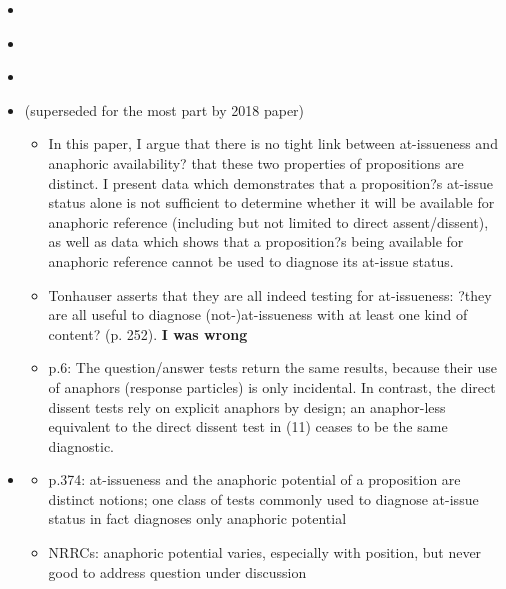 \documentclass[11pt,fleqn]{article}
\newcommand{\6}{\mbox{$[\hspace*{-.6mm}[$}}
\newcommand{\9}{\mbox{$]\hspace*{-.6mm}]$}}
\begin{document}
\begin{itemize}
\item \citealt{murray2014}

\item \citealt{anderbois-etal2015}

\item \citealt{snider-thesis}

\item \citealt{snider2017} (superseded for the most part by 2018 paper)

\begin{itemize}

\item In this paper, I argue that there is no tight link between at-issueness and anaphoric availability? that these two properties of propositions are distinct. I present data which demonstrates that a proposition?s at-issue status alone is not sufficient to determine whether it will be available for anaphoric reference (including but not limited to direct assent/dissent), as well as data which shows that a proposition?s being available for anaphoric reference cannot be used to diagnose its at-issue status.

\item  Tonhauser asserts that they are all indeed testing for at-issueness: ?they are all useful to diagnose (not-)at-issueness with at least one kind of content? (p. 252). {\bf I was wrong}

\item p.6: The question/answer tests return the same results, because their use of anaphors (response particles) is only incidental. In contrast, the direct dissent tests rely on explicit anaphors by design; an anaphor-less equivalent to the direct dissent test in (11) ceases to be the same diagnostic.

\end{itemize}

\item \citealt{snider2018}

\begin{itemize}

\item p.374: at-issueness and the anaphoric potential of a proposition are distinct notions; one class of tests commonly used to diagnose at-issue status in fact diagnoses only anaphoric potential

\item NRRCs: anaphoric potential varies, especially with position, but never good to address question under discussion


\end{itemize}
\end{itemize}
\end{document}

